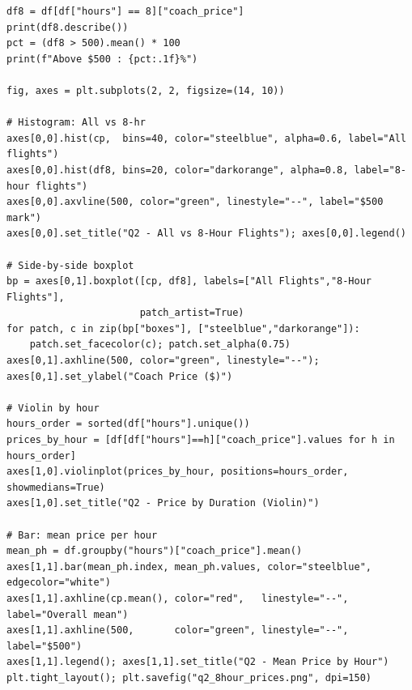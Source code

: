 \documentclass[12pt, a4paper]{report}
\begin{document}
\begin{lstlisting}[style=python, caption={Python — Filter 8-hour flights and compare price distributions}]
df8 = df[df["hours"] == 8]["coach_price"]
print(df8.describe())
pct = (df8 > 500).mean() * 100
print(f"Above $500 : {pct:.1f}%")

fig, axes = plt.subplots(2, 2, figsize=(14, 10))

# Histogram: All vs 8-hr
axes[0,0].hist(cp,  bins=40, color="steelblue", alpha=0.6, label="All flights")
axes[0,0].hist(df8, bins=20, color="darkorange", alpha=0.8, label="8-hour flights")
axes[0,0].axvline(500, color="green", linestyle="--", label="$500 mark")
axes[0,0].set_title("Q2 - All vs 8-Hour Flights"); axes[0,0].legend()

# Side-by-side boxplot
bp = axes[0,1].boxplot([cp, df8], labels=["All Flights","8-Hour Flights"],
                       patch_artist=True)
for patch, c in zip(bp["boxes"], ["steelblue","darkorange"]):
    patch.set_facecolor(c); patch.set_alpha(0.75)
axes[0,1].axhline(500, color="green", linestyle="--"); axes[0,1].set_ylabel("Coach Price ($)")

# Violin by hour
hours_order = sorted(df["hours"].unique())
prices_by_hour = [df[df["hours"]==h]["coach_price"].values for h in hours_order]
axes[1,0].violinplot(prices_by_hour, positions=hours_order, showmedians=True)
axes[1,0].set_title("Q2 - Price by Duration (Violin)")

# Bar: mean price per hour
mean_ph = df.groupby("hours")["coach_price"].mean()
axes[1,1].bar(mean_ph.index, mean_ph.values, color="steelblue", edgecolor="white")
axes[1,1].axhline(cp.mean(), color="red",   linestyle="--", label="Overall mean")
axes[1,1].axhline(500,       color="green", linestyle="--", label="$500")
axes[1,1].legend(); axes[1,1].set_title("Q2 - Mean Price by Hour")
plt.tight_layout(); plt.savefig("q2_8hour_prices.png", dpi=150)
\end{lstlisting}
\end{document}
